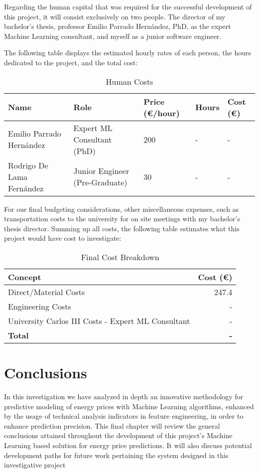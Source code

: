 \documentclass[12pt]{report} %
\begin{document}
Regarding the human capital that was required for the successful development of this project, it will consist exclusively on two people. The director of my bachelor's thesis, professor Emilio Parrado Hernández, PhD, as the expert Machine Learning consultant, and myself as a junior software engineer.

The following table displays the estimated hourly rates of each person, the hours dedicated to the project, and the total cost:
            
\begin{table}[H]
	\caption{Human Costs}
	\centering
	\begin{tabular}{|P{4cm}|P{3.5cm}|P{1.8cm}|P{1.5cm}|P{1.5cm}|}
		\hline
		\textbf{Name} & \textbf{Role} & \textbf{Price (€/hour)} & \textbf{Hours} & \textbf{Cost (€)} \\
		\hline
		Emilio Parrado Hernández & Expert ML Consultant (PhD) & 200 & - & - \\
		\hline
		Rodrigo De Lama Fernández & Junior Engineer (Pre-Graduate) & 30 & - & - \\
		\hline
	\end{tabular}
\end{table}

For our final budgeting considerations, other miscellaneous expenses, such as transportation costs to the university for on site meetings with my bachelor's thesis director. Summing up all costs, the following table estimates what this project would have cost to investigate:

\begin{table}[H]
    \caption{Final Cost Breakdown}
    \centering
    \begin{tabular}{|l|r|}
        \hline
        \textbf{Concept} & \textbf{Cost (€)} \\
        \hline
        Direct/Material Costs & 247.4 \\
        Engineering Costs & - \\
        University Carlos III Costs - Expert ML Consultant & - \\
        \hline
        \textbf{Total} & \textbf{-} \\
        \hline
    \end{tabular}
\end{table}



\chapter{Conclusions}
In this investigation we have analyzed in depth an innovative methodology for predictive modeling of energy prices with Machine Learning algorithms, enhanced by the usage of technical analysis indicators in feature engineering, in order to enhance prediction precision. This final chapter will review the general conclusions attained throughout the development of this project's Machine Learning based solution for energy price predictions. It will also discuss potential development paths for future work pertaining the system designed in this investigative project
\end{document}
